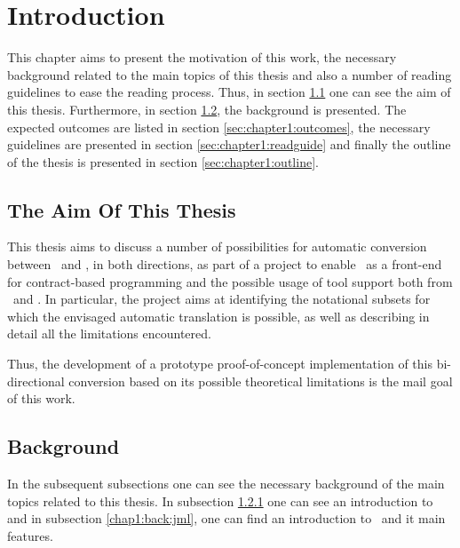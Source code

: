 \chapter{Introduction}
\label{sec:chapter1}

This chapter aims to present the motivation of this work, the necessary background related to the main topics of this thesis and also a number of reading guidelines to ease the reading process. Thus, in section \ref{sec:chapter1:context} one can see the aim of this thesis. Furthermore, in section \ref{chap1:back}, the background is presented. The expected outcomes are listed in section \ref{sec:chapter1:outcomes}, the necessary guidelines are presented in section \ref{sec:chapter1:readguide} and finally the outline of the thesis is presented in section \ref{sec:chapter1:outline}.


\section{The Aim Of This Thesis}
\label{sec:chapter1:context}
This thesis aims to discuss a number of possibilities for automatic conversion between \vpp\ and \jml, in both directions, as part of a project to enable \vpp\  as a front-end for contract-based programming and the possible usage of tool support both from \vpp\ and \jml. In particular, the project aims at identifying  the notational subsets for which the envisaged automatic translation is possible, as well as describing in detail all the limitations encountered. 

Thus, the development of a prototype proof-of-concept implementation of this bi-directional conversion based on its possible theoretical limitations is the mail goal of this work.

\section{Background}
\label{chap1:back}

In the subsequent subsections one can see the necessary background of the main topics related to this thesis. In subsection \ref{chap1:back:vpp} one can see an introduction to \vpp and in subsection \ref{chap1:back:jml}, one can find an introduction to \jml\ and it main features. 

\subsection{\vpp}
\label{chap1:back:vpp}


